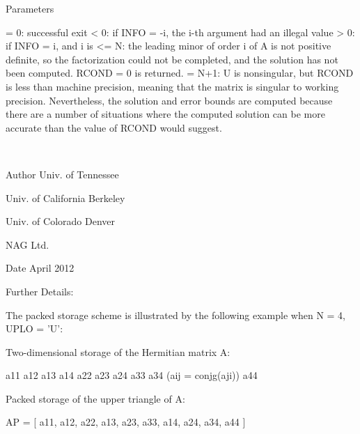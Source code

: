 \begin{DoxyParams}[1]{Parameters}
\begin{DoxyVerb}
          = 0:  successful exit
          < 0:  if INFO = -i, the i-th argument had an illegal value
          > 0:  if INFO = i, and i is
                <= N:  the leading minor of order i of A is
                       not positive definite, so the factorization
                       could not be completed, and the solution has not
                       been computed. RCOND = 0 is returned.
                = N+1: U is nonsingular, but RCOND is less than machine
                       precision, meaning that the matrix is singular
                       to working precision.  Nevertheless, the
                       solution and error bounds are computed because
                       there are a number of situations where the
                       computed solution can be more accurate than the
                       value of RCOND would suggest.\end{DoxyVerb}
 \\
\hline
\end{DoxyParams}
\begin{DoxyAuthor}{Author}
Univ. of Tennessee 

Univ. of California Berkeley 

Univ. of Colorado Denver 

N\+A\+G Ltd. 
\end{DoxyAuthor}
\begin{DoxyDate}{Date}
April 2012 
\end{DoxyDate}
\begin{DoxyParagraph}{Further Details\+: }
\begin{DoxyVerb}  The packed storage scheme is illustrated by the following example
  when N = 4, UPLO = 'U':

  Two-dimensional storage of the Hermitian matrix A:

     a11 a12 a13 a14
         a22 a23 a24
             a33 a34     (aij = conjg(aji))
                 a44

  Packed storage of the upper triangle of A:

  AP = [ a11, a12, a22, a13, a23, a33, a14, a24, a34, a44 ]\end{DoxyVerb}
 
\end{DoxyParagraph}
